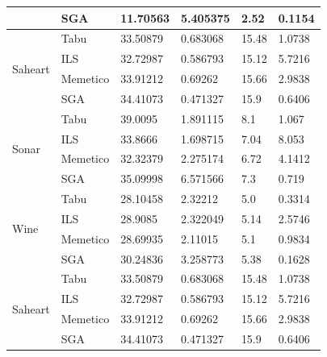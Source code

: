 \documentclass[11pt]{article}
\begin{document}
\begin{table}[h]
{\begin{tabular}{ |l|l|l|l|l|l| }
                                  & SGA      & 11.70563   & 5.405375     &  2.52   & 0.1154\\ \hline
    \multirow{4}{*}{Saheart}  & Tabu     & 33.50879   & 0.683068     &  15.48  & 1.0738 \\
                              & ILS      & 32.72987   & 0.586793     &  15.12  & 5.7216 \\
                              & Memetico & 33.91212   & 0.69262      &  15.66  & 2.9838 \\
                              & SGA      & 34.41073   & 0.471327     &  15.9   & 0.6406\\ \hline
    \multirow{4}{*}{Sonar}  & Tabu     & 39.0095    & 1.891115     &  8.1    & 1.067 \\
                            & ILS      & 33.8666    & 1.698715     &  7.04   & 8.053 \\
                            & Memetico & 32.32379   & 2.275174     &  6.72   & 4.1412 \\
                            & SGA      & 35.09998   & 6.571566     &  7.3    & 0.719\\ \hline
    \multirow{4}{*}{Wine} & Tabu     & 28.10458   &  2.32212     &  5.0      & 0.3314 \\
                          & ILS      & 28.9085    &  2.322049    &  5.14   & 2.5746 \\
                          & Memetico & 28.69935   &  2.11015     &  5.1    & 0.9834 \\
                          & SGA      & 30.24836   &  3.258773    &  5.38   & 0.1628\\ \hline
    \multirow{4}{*}{Saheart}  & Tabu     & 33.50879   & 0.683068     &  15.48  & 1.0738 \\
                              & ILS      & 32.72987   & 0.586793     &  15.12  & 5.7216 \\
                              & Memetico & 33.91212   & 0.69262      &  15.66  & 2.9838 \\
                              & SGA      & 34.41073   & 0.471327     &  15.9   & 0.6406\\ \hline
\end{tabular}
}
\end{table}

\newpage
\end{document}
